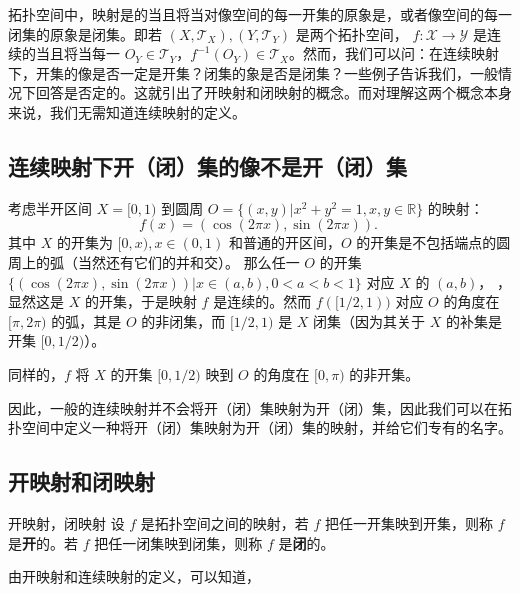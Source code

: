
拓扑空间中，映射是的当且将当对像空间的每一开集的原象是，或者像空间的每一闭集的原象是闭集。即若 $(X,\mathcal T_X),(Y,\mathcal T_Y)$ 是两个拓扑空间， $f:\mathcal X\rightarrow\mathcal Y$ 是连续的当且将当每一 $O_Y\in\mathcal T_Y$，$f^{-1}(O_Y)\in\mathcal T_X$。然而，我们可以问：在连续映射下，开集的像是否一定是开集？闭集的象是否是闭集？一些例子告诉我们，一般情况下回答是否定的。这就引出了开映射和闭映射的概念。而对理解这两个概念本身来说，我们无需知道连续映射的定义。

\subsection{连续映射下开（闭）集的像不是开（闭）集}
\begin{example}{}
考虑半开区间 $X=[0,1)$ 到圆周 $O=\{(x,y)|x^2+y^2=1,x,y\in\mathbb R\}$ 的映射：
\begin{equation}
f(x)=(\cos(2\pi x),\sin(2\pi x)).~
\end{equation}
其中 $X$ 的开集为 $[0,x),x\in (0,1)$ 和普通的开区间，$O$ 的开集是不包括端点的圆周上的弧（当然还有它们的并和交）。
那么任一 $O$ 的开集 $\{(\cos(2\pi x),\sin(2\pi x))|x\in(a,b),0<a<b<1\}$ 对应 $X$ 的 $(a,b)$，
，显然这是 $X$ 的开集，于是映射 $f$ 是连续的。然而 $f([1/2,1))$ 对应 $O$ 的角度在 $[\pi,2\pi)$ 的弧，其是 $O$ 的非闭集，而 $[1/2,1)$ 是 $X$ 闭集（因为其关于 $X$ 的补集是开集 $[0,1/2)$）。

同样的，$f$ 将 $X$ 的开集 $[0,1/2)$ 映到 $O$ 的角度在 $[0,\pi)$ 的非开集。
\end{example}

因此，一般的连续映射并不会将开（闭）集映射为开（闭）集，因此我们可以在拓扑空间中定义一种将开（闭）集映射为开（闭）集的映射，并给它们专有的名字。

\subsection{开映射和闭映射}

\begin{definition}{开映射，闭映射}
设 $f$ 是拓扑空间之间的映射，若 $f$ 把任一开集映到开集，则称 $f$ 是\textbf{开}的。若 $f$ 把任一闭集映到闭集，则称 $f$ 是\textbf{闭}的。
\end{definition}

由开映射和连续映射的定义，可以知道，




